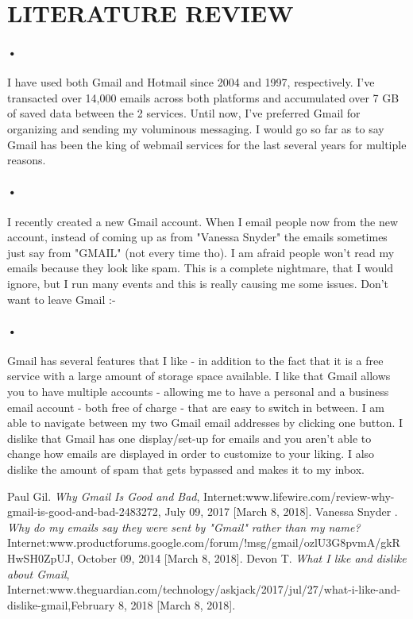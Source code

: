 \documentclass[a4paper,12pt]{article}
\begin{document}
\section{LITERATURE REVIEW}
\paragraph{•}
I have used both Gmail and Hotmail since 2004 and 1997, respectively. I've transacted over 14,000 emails across both platforms and accumulated over 7 GB of saved data between the 2 services. Until now, I've preferred Gmail for organizing and sending my voluminous messaging. I would go so far as to say Gmail has been the king of webmail services for the last several years for multiple reasons. \cite{Gil}

\paragraph{•}
I recently created a new Gmail account. When I email people now from the new account, instead of coming up as from "Vanessa Snyder" the emails sometimes just say from "GMAIL" (not every time tho). I am afraid people won't read my emails because they look like spam. 
This is a complete nightmare, that I would ignore, but I run many events and this is really causing me some issues. Don't want to leave Gmail :- \cite{Vanessa}



\paragraph{•}
Gmail has several features that I like - in addition to the fact that it is a free service with a large amount of storage space available. I like that Gmail allows you to have multiple accounts - allowing me to have a personal and a business email account - both free of charge - that are easy to switch in between. I am able to navigate between my two Gmail email addresses by clicking one button.  
I dislike that Gmail has one display/set-up for emails and you aren't able to change how emails are displayed in order to customize to your liking. I also dislike the amount of spam that gets bypassed and makes it to my inbox. \cite{Devon}

\begin{thebibliography}{9}
 Paul Gil. \textit{Why Gmail Is Good and Bad}, 
Internet:www.lifewire.com/review-why-gmail-is-good-and-bad-2483272, July 09, 2017  [March 8, 2018].
 Vanessa Snyder . \textit{
Why do my emails say they were sent by "Gmail" rather than my name?} 
Internet:www.productforums.google.com/forum/!msg/gmail/ozlU3G8pvmA/gkRHwSH0ZpUJ, October 09, 2014 [March 8, 2018].
 Devon T. \textit{What I like and dislike about Gmail},
 Internet:www.theguardian.com/technology/askjack/2017/jul/27/what-i-like-and-dislike-gmail,February 8, 2018 [March 8, 2018].
\end{thebibliography}
 
\end{document}
